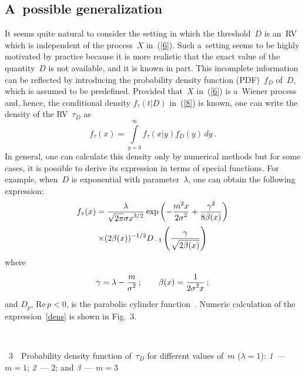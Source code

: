 \begin{multicols}{2}
\subsection{A~possible  generalization} 



 \noindent
 It seems quite natural to consider the setting in which the threshold~$D$  
 is an~RV which is independent of the process~$X$ in~(\ref{6}). 
 Such a~setting seems to be highly motivated by practice because it is more 
 realistic that the exact value of   the quantity~$D$ is not available, 
 and it is known in part. This incomplete information can be reflected by  
 introducing the probability density
 function (PDF)~$f_D$ of~$D$, which is assumed to be predefined.   
 Provided that~$X$ in~(\ref{6}) is  a~Wiener process and, hence, the conditional 
 density $f_\tau(t|D)$ in~(\ref{8}) is known, one can write  the density of the RV~$\tau_D$ as
$$
f_\tau(x)=\int\limits_{y=0}^\infty 
f_\tau(x|y)f_D(y)\,dy\,.
$$
In general, one
can calculate this density only by numerical methods 
but for some cases, it is possible to derive its expression in terms of special
 functions. For example, when~$D$  is  exponential with parameter~$\lambda$, 
 one can obtain the following expression:
\begin{multline}
f_\tau(x) = \displaystyle\frac{\displaystyle \lambda\mathstrut}{\displaystyle \sqrt{2\pi}\sigma x^{3/2}\mathstrut}\exp
\left( -\displaystyle\frac{\displaystyle m^2 x\mathstrut}{\displaystyle 2\sigma^2\mathstrut} +\displaystyle\frac{\displaystyle \gamma^2\mathstrut}{\displaystyle 8\beta(x)\mathstrut}\right)\\
 \times
(2\beta(x))^{-1/2} D_{-1}\left( \displaystyle\frac{\displaystyle \gamma\mathstrut}{\displaystyle \sqrt{2\beta(x)}\mathstrut} \right) 
\label{dens}
\end{multline}
where 
$$
\gamma=\lambda-\displaystyle\frac{\displaystyle m\mathstrut}{\displaystyle \sigma^2\mathstrut}\,;\qquad \beta(x) = \displaystyle\frac{\displaystyle 1\mathstrut}{\displaystyle 2\sigma^2 x\mathstrut}\,;
$$
and $D_p$, $\mathrm{Re}\, p <0$, is the parabolic cylinder function~\cite{19-luk-1}. 
Numeric calculation of the expression~\eqref{dens} is shown in 
Fig.~3.

{ \begin{center}  %
 \vspace*{6pt}
  \mbox{%
 \epsfxsize=78.984mm 
 }


\end{center}


\noindent
{{\figurename~3}\ \ \small{Probability density function of~$\tau_D$ for different values of~$m$ 
($\lambda=1$): \textit{1}~--- $m=1$; \textit{2}~--- $2$;  and \textit{3}~--- $m=3$}}
}

\vspace*{-3pt}

\addtocounter{figure}{1}



\end{multicols}
